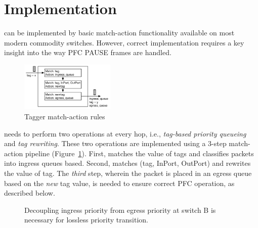 \section{Implementation}\label{sec:implementation}

\sysname{} can be implemented by basic match-action functionality
available on most modern commodity switches. However, correct implementation
requires a key insight into the way PFC PAUSE frames are handled.

\begin{figure}
	\hspace{-0.2in}
	\centering
	\includegraphics[width=0.4\textwidth] {figs/Tagger}
	\vspace{-1em}
	\caption{Tagger match-action rules}\label{fig:tagger}
	\vspace{-2em}
\end{figure}

 \sysname{} needs to perform two operations at every
hop, i.e., {\em tag-based priority queueing} and {\em tag
rewriting}.  These two operations are implemented using a 3-step match-action
pipeline (Figure~\ref{fig:tagger}).  First, \sysname{} matches
the value of tags and classifies packets into ingress queues based. Second, 
\sysname{} matches (tag, InPort, OutPort) and rewrites the value of tag. 
The {\em third} step, wherein the packet is placed in an egress queue based on the
{\em new} tag value, is needed to ensure correct PFC operation, as described below.

\begin{figure}[t]
  \vspace{-1em}
 	\centering
  \vspace{-1em}
  
	 \vspace{-1em}
 	\caption{Decoupling ingress priority from egress priority at switch B is necessary for lossless priority transition.}\label{fig:prioritydecoupling}
	\vspace{-1em}
\end{figure}


